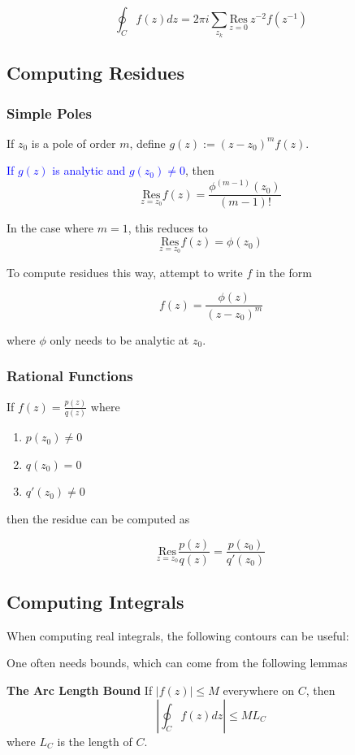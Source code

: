 \documentclass{article}
\begin{document}
\[ 
\oint_C f(z) dz = 2\pi i \sum_{z_k} \underset{z=0}{\text{Res}} ~z^{-2}f(z^{-1})
\]


\subsection{Computing Residues}

\subsubsection{Simple Poles}
If $z_0$ is a pole of order $m$, define $g(z) := (z-z_0)^m f(z)$.  

\textcolor{Blue}{If $g(z)$ is analytic and $g(z_0) \neq 0$}, then
\[
\underset{z=z_0}{\text{Res}} f(z) = \frac{\phi^{(m-1)}(z_0)}{(m-1)!}
\]

In the case where $m=1$, this reduces to
\[
\underset{z=z_0}{\text{Res}} f(z) = \phi(z_0)
\]

To compute residues this way, attempt to write $f$ in the form 

\[ f(z) = \frac{\phi(z)}{(z-z_0)^m}\]

where $\phi$ only needs to be analytic at $z_0$.

\subsubsection{Rational Functions}

If $f(z) = \frac{p(z)}{q(z)}$ where
\begin{enumerate}
   \item $p(z_0) \neq 0$
   \item $q(z_0) = 0$
   \item $q'(z_0) \neq 0$
\end{enumerate}

then the residue can be computed as

\[
\underset{z=z_0}{\text{Res}} \frac{p(z)}{q(z)} = \frac{p(z_0)}{q'(z_0)}
\]

\subsection{Computing Integrals}

When computing real integrals, the following contours can be useful:

One often needs bounds, which can come from the following lemmas

\textbf{The Arc Length Bound}
If $|f(z)| \leq M$ everywhere on $C$, then \[|\oint_C f(z) dz | \leq M L_C\] where $L_C$ is the length of $C$.
\end{document}
